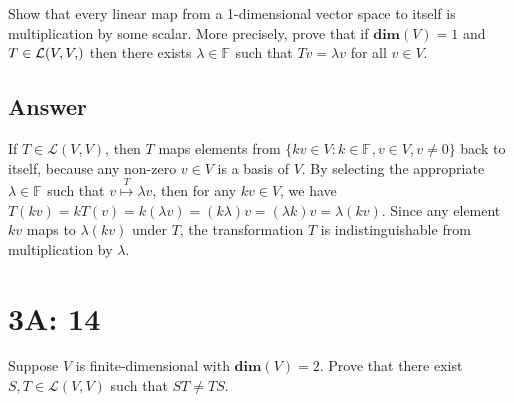 \documentclass[
	12pt, %
]{fphw}
\newcommand\0{\mathbf{0}}
\newcommand\set[1]{\{#1\}}
\newcommand\F[1]{\text{$\mathbb{F}^{#1}$}}
\renewcommand\dim[1]{\mathbf{dim}(#1)}
\renewcommand\L[2]{\mathcal{L}(#1, #2)}
\begin{document}
\begin{problem}
Show that every linear map from a 1-dimensional vector space to itself is
multiplication by some scalar. More precisely, prove that if $\dim V = 1$
and $T \in \L{V,V}$ then there exists $\lambda \in \F{}$ such that $Tv = \lambda v$ for all $v \in V$.
\end{problem}

\subsection*{Answer} 
If $T \in \L VV$, then $T$ maps elements from $\set{ kv \in V : k \in \F{}, v \in V, v \ne 0}$ back to itself, because any non-zero $v \in V$ is a basis of $V$. By selecting the appropriate $\lambda \in \F{}$ such that $v\overset{T}{\mapsto}\lambda v$, then for any $kv \in V$, we have $T(kv) = k T(v) = k(\lambda v) = (k\lambda) v = (\lambda k) v = \lambda (kv)$. Since any element $kv$ maps to $\lambda (kv)$ under $T$, the transformation $T$ is indistinguishable from multiplication by $\lambda$.


\newpage
\section*{3A: 14}

\begin{problem}
Suppose $V$ is finite-dimensional with $\dim V = 2$. Prove that there exist
$S, T \in \L VV$ such that $S T \ne T S$.
\end{problem}
\end{document}
